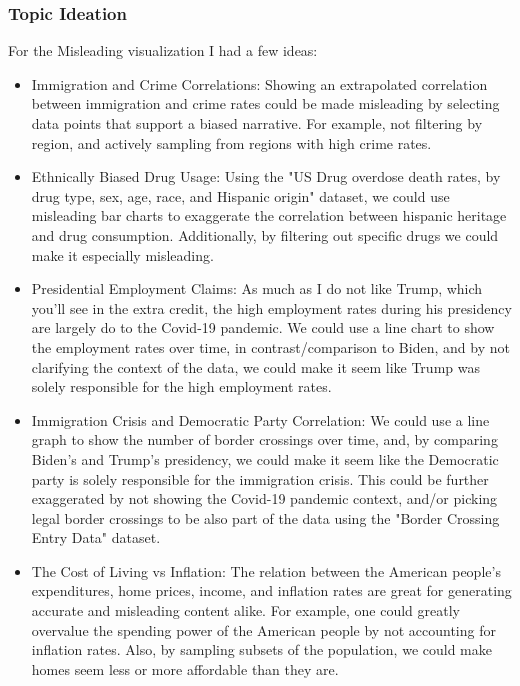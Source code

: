 \documentclass{article}
\begin{document}
\subsubsection{Topic Ideation}

For the Misleading visualization I had a few ideas:

\begin{itemize}
  \item Immigration and Crime Correlations: 
  Showing an extrapolated correlation between immigration and crime rates 
  could be made misleading by selecting data points that support a biased narrative.
  For example, not filtering by region, and actively sampling from regions with high crime rates.

  \item Ethnically Biased Drug Usage: 
  Using the "US Drug overdose death rates, by drug type, sex, age, race, and Hispanic origin" 
  \cite{drugOverdoseDeathRates} dataset, we could use misleading bar charts to exaggerate the 
  correlation between hispanic heritage and drug consumption. Additionally, by 
  filtering out specific drugs we could make it especially misleading.

  \item Presidential Employment Claims:
  As much as I do not like Trump, which you'll see in the extra credit,
  the high employment rates during his presidency are largely do to the Covid-19 pandemic.
  We could use a line chart to show the employment rates over time, in contrast/comparison to Biden, 
  and by not clarifying the context of the data, we could make it seem like Trump 
  was solely responsible for the high employment rates.

  \item Immigration Crisis and Democratic Party Correlation:
  We could use a line graph to show the number of border crossings over time, and, by comparing
  Biden's and Trump's presidency, we could make it seem like the Democratic party is solely 
  responsible for the immigration crisis. This could be further exaggerated by not showing the
  Covid-19 pandemic context, and/or picking legal border crossings to be also part of the data using
  the "Border Crossing Entry Data" \cite{borderCrossingEntryData} dataset. 
  
  \item The Cost of Living vs Inflation: 
  The relation between the American people's expenditures, home prices, income, and inflation rates
  are great for generating accurate and misleading content alike. For example, one could
  greatly overvalue the spending power of the American people by not accounting for inflation rates.
  Also, by sampling subsets of the population, we could make homes seem less or more affordable than they are.
\end{itemize}
\end{document}
